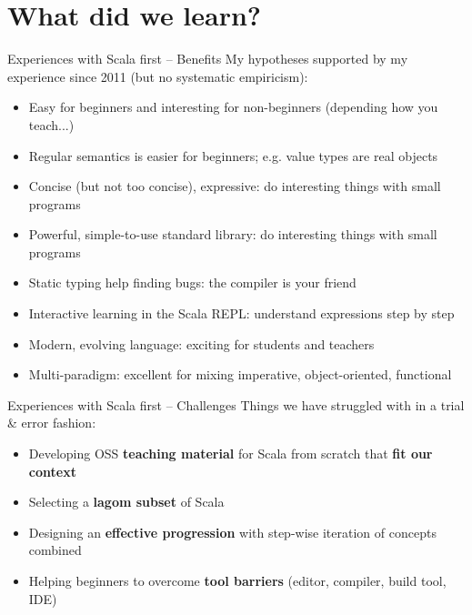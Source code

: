 \documentclass[aspectratio=169]{beamer}
\newcommand{\Section}[1]{\titleimagecolor{red}\section{#1}}
\newenvironment{Slide}[1]%
  {\begin{frame}[environment=Slide]{#1}}
  {\end{frame}}%
\begin{document}


\Section{What did we learn?}


\begin{Slide}{Experiences with Scala first -- Benefits}
  My hypotheses supported by my experience since 2011 (but no systematic empiricism):
  \begin{itemize}
  \item Easy for beginners and interesting for non-beginners (depending how you teach...)
  \item Regular semantics is easier for beginners; e.g. value types are real objects
  \item Concise (but not too concise), expressive: do interesting things with small programs
  \item Powerful, simple-to-use standard library: do interesting things with small programs
  \item Static typing help finding bugs: the compiler is your friend
  \item Interactive learning in the Scala REPL: understand expressions step by step
  \item Modern, evolving language: exciting for students and teachers
  \item Multi-paradigm: excellent for mixing imperative, object-oriented, functional
  \end{itemize}  
\end{Slide}

\begin{Slide}{Experiences with Scala first -- Challenges}
  Things we have struggled with in a trial \& error fashion:
  \begin{itemize}
  \item Developing OSS \textbf{teaching material} for Scala from scratch that \textbf{fit our context} 
  \item Selecting a \textbf{lagom subset} of Scala
  \item Designing an \textbf{effective progression} with step-wise iteration of concepts combined
  \item Helping beginners to overcome \textbf{tool barriers} (editor, compiler, build tool, IDE)
  \end{itemize}  
\end{Slide}
\end{document}
